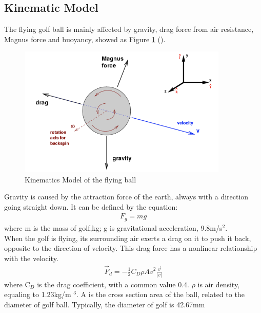 \subsection{Kinematic Model}
The flying golf ball is mainly affected by gravity, drag force from air resistance, Magnus force and buoyancy, showed as Figure \ref{fig:model} (\cite{KinematicModel}). 
\begin{figure}[H]
    \centering
    \includegraphics[width=10cm]{figure/force.png}
    \caption{Kinematics Model of the flying ball}
    \label{fig:model}
\end{figure}
Gravity is caused by the attraction force of the earth, always with a direction going straight down. It can be defined by the equation:
\begin{align}
F_{g}=m g
\end{align}
where m is the mass of golf,kg; g is gravitational acceleration, 9.8m/s$^2$.\\

When the golf is flying, its surrounding air exerts a drag on it to push it back, opposite to the direction of velocity. This drag force has a nonlinear relationship with the velocity.
\begin{align}
\vec{F}_{d}=-\frac{1}{2} C_{D} \rho A v^{2} \frac{\vec{v}}{|v|}
\end{align}
where C$_D$ is the drag coefficient, with a common value 0.4. $\rho$ is air density, equaling to 1.23kg/m $^3$. A is the cross section area of the ball, related to the diameter of golf ball. Typically, the diameter of golf is 42.67mm\\

